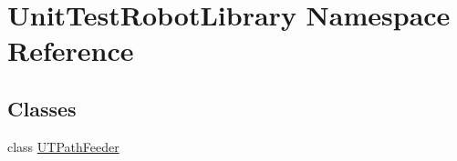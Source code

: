 \hypertarget{namespace_unit_test_robot_library}{}\section{Unit\+Test\+Robot\+Library Namespace Reference}
\label{namespace_unit_test_robot_library}
\subsection*{Classes}
\begin{DoxyCompactItemize}
\item 
class \hyperlink{class_unit_test_robot_library_1_1_u_t_path_feeder}{U\+T\+Path\+Feeder}
\end{DoxyCompactItemize}
